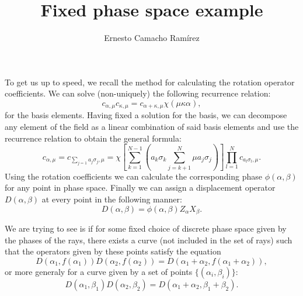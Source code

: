 \documentclass[a4paper]{article}
\title{Fixed phase space example}
\author{Ernesto Camacho Ramírez}
\begin{document}
  \maketitle

  To get us up to speed, we recall the method for
  calculating the rotation operator coefficients. We can
  solve (non-uniquely) the following recurrence relation:
  \begin{equation}
    c_{\alpha,\mu} c_{\kappa,\mu}
    = c_{\alpha+\kappa,\mu} \chi(\mu\kappa\alpha),
  \end{equation}
  for the basis elements. Having fixed a solution for the
  basis, we can decompose any element of the field as a
  linear combination of said basis elements and use the
  recurrence relation to obtain the general formula:
  \begin{equation}
    c_{\alpha,\mu}
    = c_{\sum_{j=1}^{} a_j \sigma_j,\mu}
    = \chi\left[
    \sum_{k=1}^{N-1} \left(
      a_k \sigma_k
      \sum_{j=k+1}^{N} \mu a_j \sigma_j
    \right) \right]
    \prod_{l=1}^N c_{a_l \sigma_l, \mu}.
  \end{equation}
  Using the rotation coefficients we can calculate the
  corresponding phase $\phi(\alpha,\beta)$ for any point in
  phase space. Finally we can assign a displacement operator
  $D(\alpha,\beta)$ at every point in the following manner:
  \begin{equation}
    D(\alpha,\beta)
    = \phi(\alpha,\beta) Z_\alpha X_\beta.
  \end{equation}

  We are trying to see is if for some fixed choice of discrete
  phase space given by the phases of the rays, there exists
  a curve (not included in the set of rays) such that the
  operators given by these points satisfy the equation
  \begin{equation}
    D(\alpha_1,f(\alpha_1)) D(\alpha_2,f(\alpha_2))
    = D(\alpha_1+\alpha_2, f(\alpha_1+\alpha_2)),
  \end{equation}
  or more generaly for a curve given by a set of points
  $\{(\alpha_i,\beta_i)\}$:
  \begin{equation}
    \label{eqn:prop}
    D(\alpha_1,\beta_1) D(\alpha_2,\beta_2)
    = D(\alpha_1+\alpha_2, \beta_1+\beta_2).
  \end{equation}
  
\end{document}

